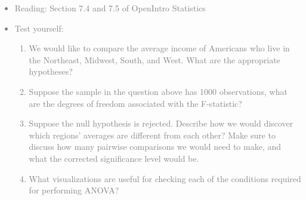 \documentclass[11pt]{article}
\newcommand{\gray}[1]{\textcolor{gray}{#1}}
\begin{document}
\gray{
{\it
\vspace{-0.55cm}
\begin{itemize}
\renewcommand{\labelitemi}{{\textcolor{dark}{$\ast$}}}
\item Reading: Section 7.4 and 7.5 of OpenIntro Statistics
\item Test yourself:
\begin{enumerate}
\item We would like to compare the average income of Americans who live in the Northeast, Midwest, South, and West. What are the appropriate hypotheses?
\item Suppose the sample in the question above has 1000 observations, what are the degrees of freedom associated with the F-statistic?
\item Suppose the null hypothesis is rejected. Describe how we would discover which regions' averages are different from each other? Make sure to discuss how many pairwise comparisons we would need to make, and what the corrected significance level would be.
\item What visualizations are useful for checking each of the conditions required for performing ANOVA?
\end{enumerate}
\end{itemize}
}}
\end{document}
